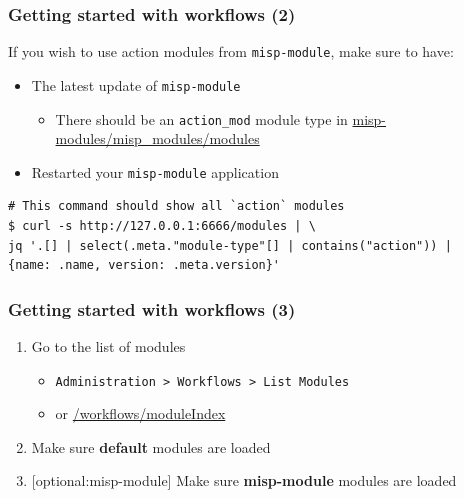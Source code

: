 \begin{frame}[fragile]
    \frametitle{Getting started with workflows (2)}
    If you wish to use action modules from \texttt{misp-module}, make sure to have:
    \begin{itemize}
        \item The latest update of \texttt{misp-module}
        \begin{itemize}
            \item There should be an \texttt{action\_mod} module type in \url{misp-modules/misp\_modules/modules}
        \end{itemize}
        \item Restarted your \texttt{misp-module} application
    \end{itemize}
    \vspace{1em}
    \begin{lstlisting}[language=text,firstnumber=1]
# This command should show all `action` modules
$ curl -s http://127.0.0.1:6666/modules | \
jq '.[] | select(.meta."module-type"[] | contains("action")) | 
{name: .name, version: .meta.version}'
    \end{lstlisting}
\end{frame}

\begin{frame}
    \frametitle{Getting started with workflows (3)}
    \begin{enumerate}
        \item Go to the list of modules
        \begin{itemize}
            \item \texttt{Administration > Workflows > List Modules}
            \item or \url{/workflows/moduleIndex}
        \end{itemize}
        \item Make sure \textbf{default} modules are loaded
        \item {[optional:misp-module]} Make sure \textbf{misp-module} modules are loaded
    \end{enumerate}
\end{frame}

